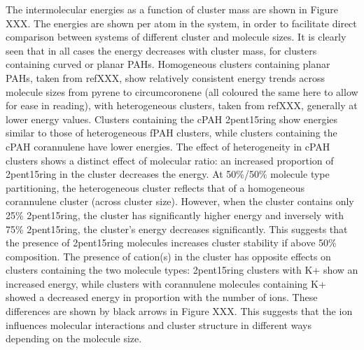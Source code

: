 The intermolecular energies as a function of cluster mass are shown in Figure XXX.  The energies are shown per atom in the system, in order to facilitate direct comparison between systems of different cluster and molecule sizes.
It is clearly seen that in all cases the energy decreases with cluster mass, for clusters containing curved or planar PAHs.  Homogeneous clusters containing planar PAHs, taken from refXXX, show relatively consistent energy trends across molecule sizes from pyrene to circumcoronene (all coloured the same here to allow for ease in reading), with heterogeneous clusters, taken from refXXX, generally at lower energy values.  Clusters containing the cPAH 2pent15ring show energies similar to those of heterogeneous fPAH clusters, while clusters containing the cPAH corannulene have lower energies.
The effect of heterogeneity in cPAH clusters shows a distinct effect of molecular ratio: an increased proportion of 2pent15ring in the cluster decreases the energy. At 50\%/50\% molecule type partitioning, the heterogeneous cluster reflects that of a homogeneous corannulene cluster (across cluster size). However, when the cluster contains only 25\% 2pent15ring, the cluster has significantly higher energy and inversely with 75\% 2pent15ring, the cluster's energy decreases significantly.  This suggests that the presence of 2pent15ring molecules increases cluster stability if above 50\% composition.
The presence of cation(s) in the cluster has opposite effects on clusters containing the two molecule types: 2pent15ring clusters with K+ show an increased energy, while clusters with corannulene molecules containing K+ showed a decreased energy in proportion with the number of ions.  These differences are shown by black arrows in Figure XXX. This suggests that the ion influences molecular interactions and cluster structure in different ways depending on the molecule size.
%
%

